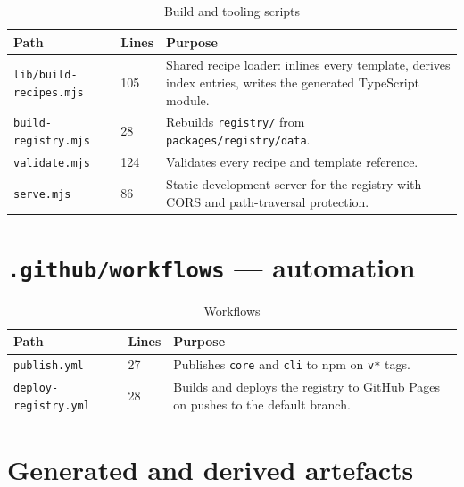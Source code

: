 \begin{longtable}{p{5.4cm}p{2.2cm}p{6.8cm}}
\caption{Build and tooling scripts}\\
\toprule
\textbf{Path} & \textbf{Lines} & \textbf{Purpose} \\
\midrule

\texttt{lib/build-recipes.mjs} & 105 & Shared recipe loader: inlines every template,
derives index entries, writes the generated TypeScript module. \\
\texttt{build-registry.mjs} & 28 & Rebuilds \texttt{registry/} from
\texttt{packages/registry/data}. \\
\texttt{validate.mjs} & 124 & Validates every recipe and template reference. \\
\texttt{serve.mjs} & 86 & Static development server for the registry with CORS and
path-traversal protection. \\
\bottomrule
\end{longtable}

\section{\texttt{.github/workflows} --- automation}

\begin{longtable}{p{5.4cm}p{2.2cm}p{6.8cm}}
\caption{Workflows}\\
\toprule
\textbf{Path} & \textbf{Lines} & \textbf{Purpose} \\
\midrule

\texttt{publish.yml} & 27 & Publishes \texttt{core} and \texttt{cli} to npm on
\texttt{v*} tags. \\
\texttt{deploy-registry.yml} & 28 & Builds and deploys the registry to GitHub Pages
on pushes to the default branch. \\
\bottomrule
\end{longtable}

\section{Generated and derived artefacts}


